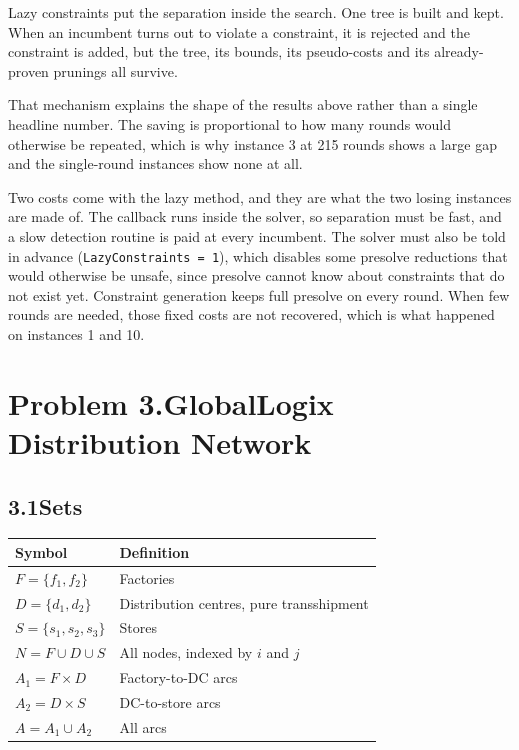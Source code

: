 \documentclass[11pt]{article}
\begin{document}
Lazy constraints put the separation inside the search. One tree is built
and kept. When an incumbent turns out to violate a constraint, it is
rejected and the constraint is added, but the tree, its bounds, its
pseudo-costs and its already-proven prunings all survive.

That mechanism explains the shape of the results above rather than a
single headline number. The saving is proportional to how many rounds
would otherwise be repeated, which is why instance 3 at 215 rounds shows
a large gap and the single-round instances show none at all.

Two costs come with the lazy method, and they are what the two losing
instances are made of. The callback runs inside the solver, so
separation must be fast, and a slow detection routine is paid at every
incumbent. The solver must also be told in advance
(\texttt{LazyConstraints = 1}), which disables some presolve reductions
that would otherwise be unsafe, since presolve cannot know about
constraints that do not exist yet. Constraint generation keeps full
presolve on every round. When few rounds are needed, those fixed costs
are not recovered, which is what happened on instances 1 and 10.

\newpage
\section*{Problem 3.\quad GlobalLogix Distribution Network \quad[45 pts]}

\subsection*{3.1\quad Sets}

\begin{center}
\begin{tabular}{@{}ll@{}}
\toprule
Symbol & Definition \\
\midrule
$F = \{f_1, f_2\}$        & Factories \\
$D = \{d_1, d_2\}$        & Distribution centres, pure transshipment \\
$S = \{s_1, s_2, s_3\}$   & Stores \\
$N = F \cup D \cup S$     & All nodes, indexed by $i$ and $j$ \\
$A_1 = F \times D$        & Factory-to-DC arcs \\
$A_2 = D \times S$        & DC-to-store arcs \\
$A = A_1 \cup A_2$        & All arcs \\
\bottomrule
\end{tabular}
\end{center}
\end{document}
